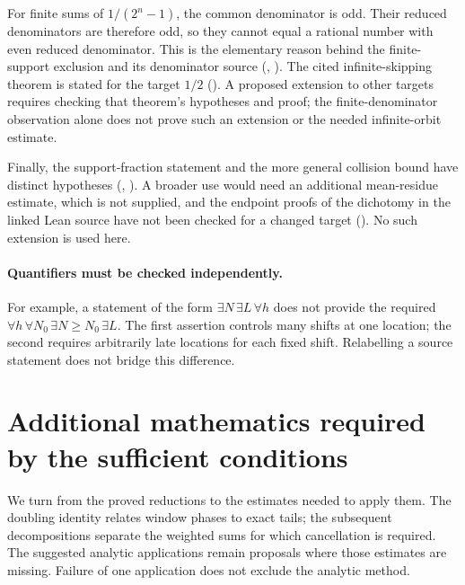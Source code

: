 For finite sums of $1/(2^n-1)$, the common denominator is odd.
Their reduced denominators are therefore odd, so they cannot equal a
rational number with even reduced denominator. This is the elementary
reason behind the finite-support exclusion and its denominator source
(, ).
The cited infinite-skipping theorem is stated for the target $1/2$
(). A proposed extension to other targets requires checking
that theorem's hypotheses and proof; the finite-denominator observation
alone does not prove such an extension or the needed infinite-orbit estimate.

Finally, the support-fraction statement and the more general collision
bound have distinct hypotheses
(, ).
A broader use would need an additional mean-residue estimate, which is
not supplied, and the endpoint proofs of the dichotomy in the linked Lean
source have not been checked for a changed target
(). No such extension is used here.

\paragraph{Quantifiers must be checked independently.}
For example, a statement of the form
$\exists N\,\exists L\,\forall h$ does not provide the required
$\forall h\,\forall N_0\,\exists N\ge N_0\,\exists L$.
The first assertion controls many shifts at one location; the second
requires arbitrarily late locations for each fixed shift. Relabelling a
source statement does not bridge this difference.

\section{Additional mathematics required by the sufficient conditions}

We turn from the proved reductions to the estimates needed to apply
them. The doubling identity relates window phases to exact tails;
the subsequent decompositions separate the weighted sums for which
cancellation is required. The suggested analytic applications remain
proposals where those estimates are missing. Failure of one application
does not exclude the analytic method.

